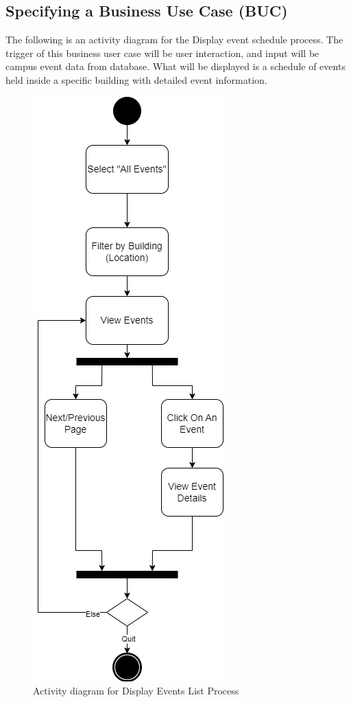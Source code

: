 \documentclass[12pt]{article}
\begin{document}
\subsection{Specifying a Business Use Case (BUC)}

The following is an activity diagram for the Display event schedule process. The trigger of this business user case will be user interaction, and input will be campus event data from database. What will be displayed is a schedule of events held inside a specific building with detailed event information.
\begin{figure}[H]
\begin{center}
\includegraphics[scale=0.5]{BUC_Activity_Diagram.png}
\end{center}
\caption{Activity diagram for Display Events List Process}
\end{figure}
\end{document}
